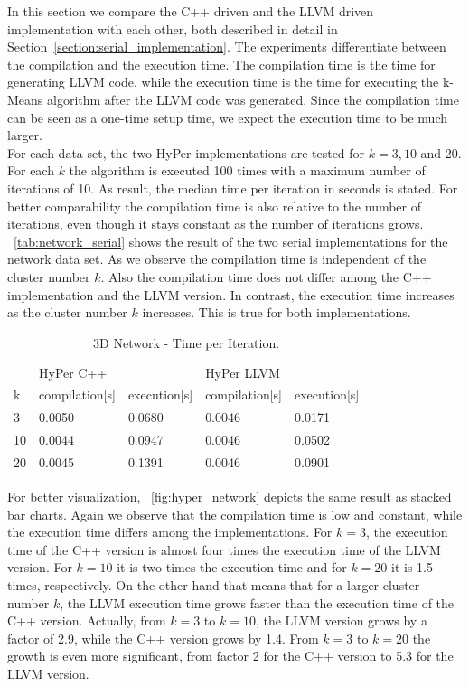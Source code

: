 In this section we compare the C++ driven and the LLVM driven implementation with each other, both described in detail in Section~\ref{section:serial_implementation}. The experiments differentiate between the compilation and the execution time. The compilation time is the time for generating LLVM code, while the execution time is the time for executing the k-Means algorithm after the LLVM code was generated. Since the compilation time can be seen as a one-time setup time, we expect the execution time to be much larger. 
\\
For each data set, the two HyPer implementations are tested for $k = 3,10$ and 20. For each $k$ the algorithm is executed 100 times with a maximum number of iterations of 10. As result, the median time per iteration in seconds is stated. For better comparability the compilation time is also relative to the number of iterations, even though it stays constant as the number of iterations grows.
\\
~\autoref{tab:network_serial} shows the result of the two serial implementations for the network data set. As we observe the compilation time is independent of the cluster number $k$. Also the compilation time does not differ among the C++ implementation and the LLVM version. In contrast, the execution time increases as the cluster number $k$ increases. This is true for both implementations. 

\begin{table}[htsb]
  \caption[3D Network - Time per Iteration]{3D Network - Time per Iteration.}\label{tab:network_serial}
  \centering
  \begin{tabular}{l l l l l}
    \toprule
      & HyPer C++ & & HyPer LLVM & \\
      k & compilation[s] & execution[s] & compilation[s] & execution[s] \\
    \midrule
      3 & 0.0050 & 0.0680 & 0.0046 & 0.0171 \\
      10 & 0.0044 & 0.0947 & 0.0046 & 0.0502 \\
      20 & 0.0045 & 0.1391 & 0.0046 & 0.0901 \\
    \bottomrule
  \end{tabular}
\end{table}


For better visualization, ~\autoref{fig:hyper_network} depicts the same result as stacked bar charts. Again we observe that the compilation time is low and constant, while the execution time differs among the implementations. For $k = 3$, the execution time of the C++ version is almost four times the execution time of the LLVM version. For $k = 10$ it is two times the execution time and for $k = 20$ it is 1.5 times, respectively. On the other hand that means that for a larger cluster number $k$, the LLVM execution time grows  faster than the execution time of the C++ version. Actually, from $k = 3$ to $k = 10$, the LLVM version grows by a factor of 2.9, while the C++ version grows by 1.4. From $k = 3$ to $k = 20$ the growth is even more significant, from factor 2 for the C++ version to 5.3 for the LLVM version.


